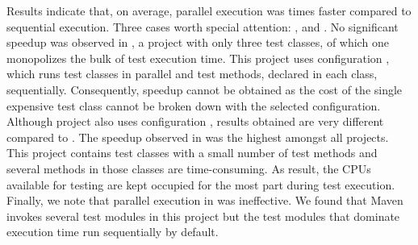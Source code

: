 \begin{table}[h!]
\centering
{}
\caption{\label{tab:speedup}Speedup (or slowdown) of parallel
  execution ($T_p$) over sequential execution ($T_s$).  Default
  parallel configuration of Maven is used.  Highest slowdown/speedup
  appears in gray color.}
\end{table}

Results indicate that, on average, parallel execution was
\avgSpeedup{} times faster compared to sequential execution.  Three
cases worth special attention: ,  and
.  No significant speedup was observed in
, a project with only three test classes, of which one
monopolizes the bulk of test execution time.  This project uses
configuration \ParClassSeqMeth{}, which runs test classes in parallel
and test methods, declared in each class, sequentially.  Consequently,
speedup cannot be obtained as the cost of the single expensive test
class cannot be broken down with the selected configuration.  Although
project  also uses configuration \ParClassSeqMeth{},
results obtained are very different compared to .  The
speedup observed in  was the highest amongst all
projects.  This project contains test classes with a small number of
test methods and several methods in those classes are time-consuming.
As result, the CPUs available for testing are kept occupied for the
most part during test execution.  Finally, we note that parallel
execution in  was ineffective.  We found that Maven
invokes several test modules in this project but the test modules that
dominate execution time run sequentially by default.

